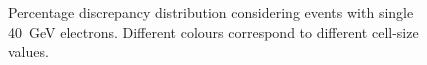 \begin{figure}
	\centering
	 \quad
	\caption{Percentage discrepancy distribution considering events with single 40~GeV electrons. Different colours correspond to different cell-size values.}
	\label{fig:perc_sat}
\end{figure}

